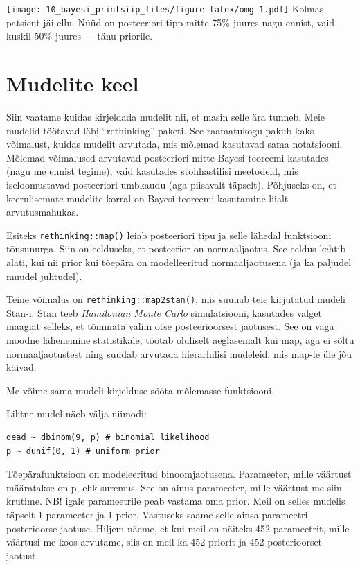 \documentclass[]{book}
\begin{document}
\texttt{[image: 10\_bayesi\_printsiip\_files/figure-latex/omg-1.pdf]}
Kolmas patsient jäi ellu. Nüüd on posteeriori tipp mitte 75\% juures
nagu ennist, vaid kuskil 50\% juures --- tänu priorile.

\chapter{Mudelite keel}\label{mudelite-keel}

Siin vaatame kuidas kirjeldada mudelit nii, et masin selle ära tunneb.
Meie mudelid töötavad läbi ``rethinking'' paketi. See raamatukogu pakub
kaks võimalust, kuidas mudelit arvutada, mis mõlemad kasutavad sama
notatsiooni. Mõlemad võimalused arvutavad posteeriori mitte Bayesi
teoreemi kasutades (nagu me ennist tegime), vaid kasutades stohhastilisi
meetodeid, mis iseloomustavad posteeriori umbkaudu (aga piisavalt
täpselt). Põhjuseks on, et keerulisemate mudelite korral on Bayesi
teoreemi kasutamine liialt arvutusmahukas.

Esiteks \texttt{rethinking::map()} leiab posteeriori tipu ja selle
lähedal funktsiooni tõusunurga. Siin on eelduseks, et posteerior on
normaaljaotus. See eeldus kehtib alati, kui nii prior kui tõepära on
modelleeritud normaaljaotusena (ja ka paljudel muudel juhtudel).

Teine võimalus on \texttt{rethinking::map2stan()}, mis suunab teie
kirjutatud mudeli Stan-i. Stan teeb \emph{Hamilonian Monte Carlo}
simulatsiooni, kasutades valget maagiat selleks, et tõmmata valim otse
posteerioorsest jaotusest. See on väga moodne lähenemine statistikale,
töötab oluliselt aeglasemalt kui map, aga ei sõltu normaaljaotustest
ning suudab arvutada hierarhilisi mudeleid, mis map-le üle jõu käivad.

Me võime sama mudeli kirjelduse sööta mõlemasse funktsiooni.

Lihtne mudel näeb välja niimodi:

\begin{verbatim}
dead ~ dbinom(9, p) # binomial likelihood
p ~ dunif(0, 1) # uniform prior
\end{verbatim}

Tõepärafunktsioon on modeleeritud binoomjaotusena. Parameeter, mille
väärtust määratakse on p, ehk suremus. See on ainus parameeter, mille
väärtust me siin krutime. NB! igale parameetrile peab vastama oma prior.
Meil on selles mudelis täpselt 1 parameeter ja 1 prior. Vastuseks saame
selle ainsa parameetri posterioorse jaotuse. Hiljem näeme, et kui meil
on näiteks 452 parameetrit, mille väärtusi me koos arvutame, siis on
meil ka 452 priorit ja 452 posterioorset jaotust.
\end{document}
